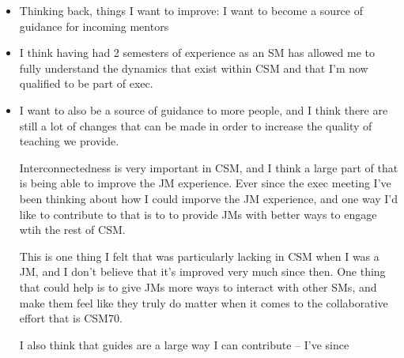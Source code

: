 \documentclass[10pt]{article}
\begin{document}
\begin{itemize}
	\item Thinking back, things I want to improve: I want to become a source of guidance for incoming mentors 
	\item I think having had 2 semesters of experience as an SM has allowed me to fully understand the dynamics 
		that exist within CSM and that I'm now qualified to be part of exec.
	\item I want to also be a source of guidance to more people, and I think there are still a lot of 
		changes that can be made in order to increase the quality of teaching we provide. 

		Interconnectedness is very important in CSM, and I think a large part of that is being able to improve the 
		JM experience. Ever since the exec meeting I've been thinking about how I could imporve the JM experience, and 
		one way I'd like to contribute to that is to to provide JMs with better ways to engage wtih the rest of 
		CSM.

		This is one thing I felt that was particularly lacking in CSM when I was a JM, and I don't believe that it's 
		improved very much since then. One thing that could help is to give JMs more ways to interact with 
		other SMs, and make them feel like they truly do matter when it comes to the collaborative effort
		that is CSM70. 

		I also think that guides are a large way I can contribute -- I've since   
\end{itemize}
\end{document}
